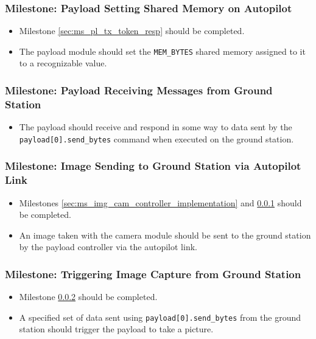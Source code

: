 	\subsubsection{Milestone: Payload Setting Shared Memory on Autopilot}
		\label{sec:ms_pl_shared_mem_set}
		\begin{itemize}
			\item 	Milestone \ref{sec:ms_pl_tx_token_resp}
				should be completed.
			\item 	The payload module should set the \verb+MEM_BYTES+ 
				shared memory assigned to it to a recognizable value.
		\end{itemize}

	\subsubsection{Milestone: Payload Receiving Messages from Ground Station}
		\label{sec:ms_pl_rx_msg_gs}
		\begin{itemize}
			\item 	The payload should receive and respond in some way to 
				data sent by the \verb+payload[0].send_bytes+ command
				when executed on the ground station.
		\end{itemize}

	\subsubsection{Milestone: Image Sending to Ground Station via Autopilot Link}
		\label{sec:ms_pl_img_sending_gs}
		\begin{itemize}
			\item 	Milestones \ref{sec:ms_img_cam_controller_implementation} and \ref{sec:ms_pl_shared_mem_set}
				should be completed.
			\item 	An image taken with the camera module should be sent to the
				ground station by the payload controller via the autopilot link.
		\end{itemize}


	\subsubsection{Milestone: Triggering Image Capture from Ground Station}
		\label{sec:ms_pl_img_gs_trigger}
		\begin{itemize}
			\item 	Milestone \ref{sec:ms_pl_rx_msg_gs}
				should be completed.
			\item 	A specified set of data sent using \verb+payload[0].send_bytes+
				from the ground station should trigger the payload to take a picture.
		\end{itemize}

